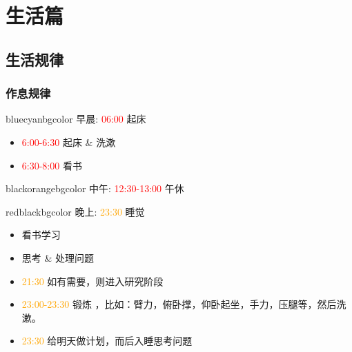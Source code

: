 \section{生活篇}
\subsection{生活规律}
\begin{frame}
	\frametitle{作息规律}
    \begin{beamercolorbox}[rounded=true,shadow=true,wd=12cm]{bluecyanbgcolor}
    早晨: \textcolor{red}{06:00} 起床\\
    \begin{itemize}
        \item \textcolor{red}{6:00-6:30} 起床 \& 洗漱
        \item \textcolor{red}{6:30-8:00} 看书
    \end{itemize}
    \end{beamercolorbox}
    \begin{beamercolorbox}[rounded=true,shadow=true,wd=12cm]{blackorangebgcolor}
    中午: \textcolor{red}{12:30-13:00} 午休\\
    \end{beamercolorbox}
    \begin{beamercolorbox}[rounded=true,shadow=true,wd=12cm]{redblackbgcolor}
    晚上: \textcolor{orange}{23:30} 睡觉\\
    \begin{itemize}
    \item 看书学习
    \item 思考 \& 处理问题
    \item \textcolor{orange}{21:30} 如有需要，则进入研究阶段
    \item \textcolor{orange}{23:00-23:30} 锻炼 ，比如：臂力，俯卧撑，仰卧起坐，手力，压腿等，然后洗漱。
    \item \textcolor{orange}{23:30} 给明天做计划，而后入睡思考问题
    \end{itemize}
    \end{beamercolorbox}
\end{frame}

